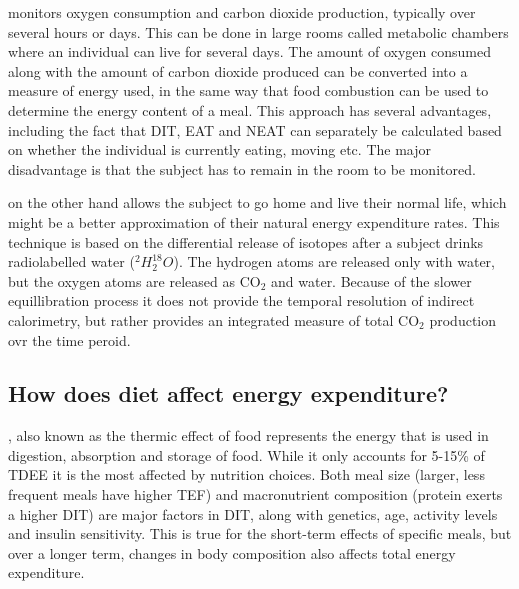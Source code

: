 \documentclass{tufte-handout}
\begin{document}
 monitors oxygen consumption and carbon dioxide production, typically over several hours or days.  This can be done in large rooms called metabolic chambers where an individual can live for several days.  The amount of oxygen consumed along with the amount of carbon dioxide produced can be converted into a measure of energy used, in the same way that food combustion can be used to determine the energy content of a meal.  This approach has several advantages, including the fact that DIT, EAT and NEAT can separately be calculated based on whether the individual is currently eating, moving etc.  The major disadvantage is that the subject has to remain in the room to be monitored.

 on the other hand allows the subject to go home and live their normal life, which might be a better approximation of their natural energy expenditure rates.  This technique is based on the differential release of isotopes after a subject drinks radiolabelled water ($^2H_2^{18}O$).  The hydrogen atoms are released only with water, but the oxygen atoms are released as CO$_2$ and water.  Because of the slower equillibration process it does not provide the temporal resolution of indirect calorimetry, but rather provides an integrated measure of total CO$_2$ production ovr the time peroid.

\subsection{How does diet affect energy expenditure?} 

, also known as the thermic effect of food represents the energy that is used in digestion, absorption and storage of food.  While it only accounts for 5-15\% of TDEE it is the most affected by nutrition choices.  Both meal size (larger, less frequent meals have higher TEF) and macronutrient composition (protein exerts a higher DIT) are major factors in DIT, along with genetics, age, activity levels and insulin sensitivity.  This is true for the short-term effects of specific meals, but over a longer term, changes in body composition also affects total energy expenditure.
\end{document}
